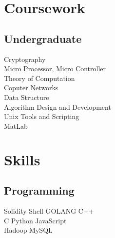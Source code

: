 \documentclass[]{deedy-resume-openfont}
\begin{document}
\begin{minipage}[t]{0.33\textwidth}
\section{Coursework}


\subsection{Undergraduate}
Cryptography\\
Micro Processor, Micro Controller \\
Theory of Computation\\
Coputer Networks\\
Data Structure \\
Algorithm Design and Development \\
Unix Tools and Scripting \\
MatLab\\
\sectionsep


\section{Skills}
\subsection{Programming}
Solidity \textbullet{}   Shell \textbullet{} GOLANG \textbullet{} C++ \\
C \textbullet{} Python \textbullet{} JavaScript  \\
Hadoop \textbullet{} MySQL
\sectionsep


%
%

\end{minipage}
\hfill
\end{document}
